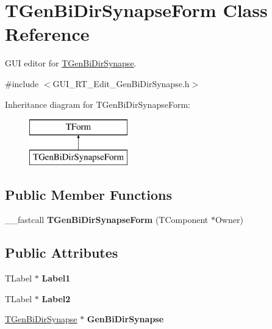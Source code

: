 \hypertarget{class_t_gen_bi_dir_synapse_form}{\section{T\+Gen\+Bi\+Dir\+Synapse\+Form Class Reference}
\label{class_t_gen_bi_dir_synapse_form}
}


G\+U\+I editor for \hyperlink{class_t_gen_bi_dir_synapse}{T\+Gen\+Bi\+Dir\+Synapse}.  




{\ttfamily \#include $<$G\+U\+I\+\_\+\+R\+T\+\_\+\+Edit\+\_\+\+Gen\+Bi\+Dir\+Synapse.\+h$>$}

Inheritance diagram for T\+Gen\+Bi\+Dir\+Synapse\+Form\+:\begin{figure}[H]
\begin{center}
\leavevmode
\includegraphics[height=2.000000cm]{class_t_gen_bi_dir_synapse_form}
\end{center}
\end{figure}
\subsection*{Public Member Functions}
\begin{DoxyCompactItemize}
\item 
\hypertarget{class_t_gen_bi_dir_synapse_form_ac04375e74b45855f22ebd0b9ee71b39a}{\+\_\+\+\_\+fastcall {\bfseries T\+Gen\+Bi\+Dir\+Synapse\+Form} (T\+Component $\ast$Owner)}\label{class_t_gen_bi_dir_synapse_form_ac04375e74b45855f22ebd0b9ee71b39a}

\end{DoxyCompactItemize}
\subsection*{Public Attributes}
\begin{DoxyCompactItemize}
\item 
\hypertarget{class_t_gen_bi_dir_synapse_form_a747363dcb7341daf908324bf0c54dd70}{T\+Label $\ast$ {\bfseries Label1}}\label{class_t_gen_bi_dir_synapse_form_a747363dcb7341daf908324bf0c54dd70}

\item 
\hypertarget{class_t_gen_bi_dir_synapse_form_a5e693794dc5a8563d042e7aafaa57dfd}{T\+Label $\ast$ {\bfseries Label2}}\label{class_t_gen_bi_dir_synapse_form_a5e693794dc5a8563d042e7aafaa57dfd}

\item 
\hypertarget{class_t_gen_bi_dir_synapse_form_a4a5c5e98b77b14a72c0bdb17b1d5e155}{\hyperlink{class_t_gen_bi_dir_synapse}{T\+Gen\+Bi\+Dir\+Synapse} $\ast$ {\bfseries Gen\+Bi\+Dir\+Synapse}}\label{class_t_gen_bi_dir_synapse_form_a4a5c5e98b77b14a72c0bdb17b1d5e155}

\end{DoxyCompactItemize}


